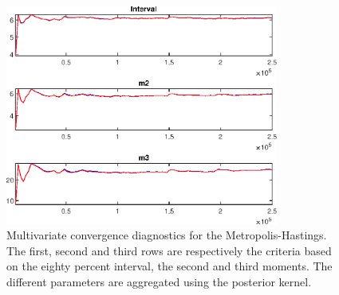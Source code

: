  
\begin{figure}[H]
\centering 
\includegraphics[width=0.8\textwidth]{two_sector_RBC_fixed_cost/Output/two_sector_RBC_fixed_cost_mdiag}
\caption{Multivariate convergence diagnostics for the Metropolis-Hastings.
The first, second and third rows are respectively the criteria based on
the eighty percent interval, the second and third moments. The different 
parameters are aggregated using the posterior kernel.}\label{Fig:MultivariateDiagnostics}
\end{figure}

